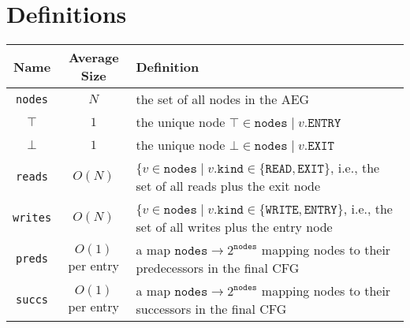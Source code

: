 \documentclass{article}
\newcommand{\kind}{\texttt{kind}}
\newcommand{\ENTRY}{\texttt{ENTRY}}
\newcommand{\EXIT}{\texttt{EXIT}}
\newcommand{\READ}{\texttt{READ}}
\newcommand{\WRITE}{\texttt{WRITE}}
\newcommand{\preds}{\texttt{preds}}
\newcommand{\succs}{\texttt{succs}}
\newcommand{\nodes}{\texttt{nodes}}
\newcommand{\writes}{\texttt{writes}}
\newcommand{\reads}{\texttt{reads}}
\begin{document}
\section{Definitions}
\begin{tabular}{|c|c|l|}\hline
  {\bf Name} & {\bf Average Size} & {\bf Definition} \\\hline
  \nodes    & $N$ & the set of all nodes in the AEG \\\hline
  $\top$    & $1$ & the unique node $\top \in \nodes \mid v.\ENTRY$ \\\hline
  $\bot$    & $1$ & the unique node $\bot \in \nodes \mid v.\EXIT$ \\\hline
  \reads    & $O(N)$ & $\{v \in \nodes \mid v.\kind \in \{\READ, \EXIT\}$, i.e., the set of all reads plus the exit node \\\hline
  \writes   & $O(N)$ & $\{v \in \nodes \mid v.\kind \in \{\WRITE, \ENTRY\}$, i.e., the set of all writes plus the entry node \\\hline
  \preds    & $O(1)$ per entry & a map $\nodes \to 2^\nodes$ mapping nodes to their predecessors in the final CFG \\\hline
  \succs  & $O(1)$ per entry  & a map $\nodes \to 2^\nodes$ mapping nodes to their successors in the final CFG \\\hline
\end{tabular}
\end{document}
